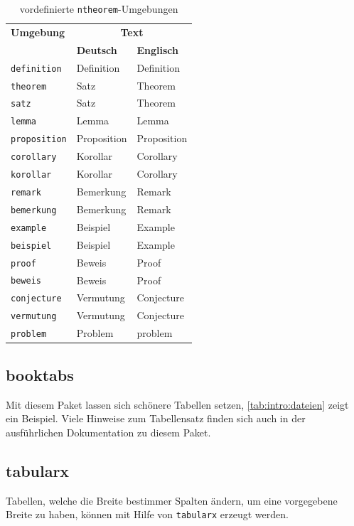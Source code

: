 \begin{table}[hbt]
  \centering
  \begin{tabular}{lll}
    \toprule%
    \textbf{Umgebung} & \multicolumn{2}{c}{\textbf{Text}} \\
    & \textbf{Deutsch} & \textbf{Englisch}\\ \midrule
    \texttt{definition} & Definition & Definition \\
    \texttt{theorem} & Satz & Theorem \\
    \texttt{satz} & Satz & Theorem \\
    \texttt{lemma} & Lemma & Lemma\\
    \texttt{proposition} & Proposition & Proposition \\
    \texttt{corollary} & Korollar & Corollary\\
    \texttt{korollar} & Korollar & Corollary\\
    \texttt{remark} & Bemerkung & Remark \\
    \texttt{bemerkung} & Bemerkung & Remark \\
    \texttt{example} & Beispiel & Example \\
    \texttt{beispiel} & Beispiel & Example \\
    \texttt{proof} & Beweis & Proof \\
    \texttt{beweis} & Beweis & Proof \\
    \texttt{conjecture} & Vermutung & Conjecture \\
    \texttt{vermutung} & Vermutung & Conjecture \\
    \texttt{problem} & Problem & problem \\
\bottomrule

    
  \end{tabular}
  \caption{vordefinierte \texttt{ntheorem}-Umgebungen}
  \label{tab:ntheorem}
\end{table}

\subsection{booktabs}
\label{sec:intro:booktabs}
Mit diesem Paket lassen sich schönere Tabellen setzen, \cref{tab:intro:dateien}
zeigt ein Beispiel. Viele Hinweise zum Tabellensatz finden sich auch in der
ausführlichen Dokumentation zu diesem Paket.

\subsection{tabularx}
\label{sec:intro:tabularx}
Tabellen, welche die Breite bestimmer Spalten ändern, um eine vorgegebene Breite zu haben, können mit Hilfe von \texttt{tabularx} erzeugt werden.

